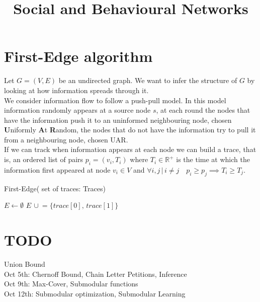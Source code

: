 \documentclass[]{article}
\title{Social and Behavioural Networks}
\author{}
\begin{document}
\maketitle
\tableofcontents

\clearpage

\section{First-Edge algorithm}
Let $G = (V, E)$ be an undirected graph. We want to infer the structure of $G$ by looking at how information spreads through it.\\We consider information flow to follow a push-pull model. In this model information randomly appears at a source node $s$, at each round the nodes that have the information push it to an uninformed neighbouring node, chosen \textbf{U}niformly \textbf{A}t \textbf{R}andom, the nodes that do not have the information try to pull it from a neighbouring node, chosen UAR.\\If we can track when information appears at each node we can build a trace, that is, an ordered list of pairs $p_i = (v_i, T_i)$ where $T_i \in \mathbb{R}^+$ is the time at which the information first appeared at node $v_i \in V$ and $\forall i,j \, |\, i\neq j  \quad p_i \geq p_j \implies T_i \geq T_j$.

\begin{algorithm}[H]
	\caption{First-Edge( set of traces: Traces)}
	\label{alg:first-edge}
	\begin{algorithmic}
		\STATE $E \leftarrow \emptyset$
			\STATE $E\, \cup\!= \{trace[0],\, trace[1]\}$
		\ENDFOR
	\end{algorithmic}
\end{algorithm}

\section{TODO}

Union Bound\\
Oct 5th: Chernoff Bound, Chain Letter Petitions, Inference\\
Oct 9th: Max-Cover, Submodular functions\\
Oct 12th: Submodular optimization, Submodular Learning\\
\end{document}
